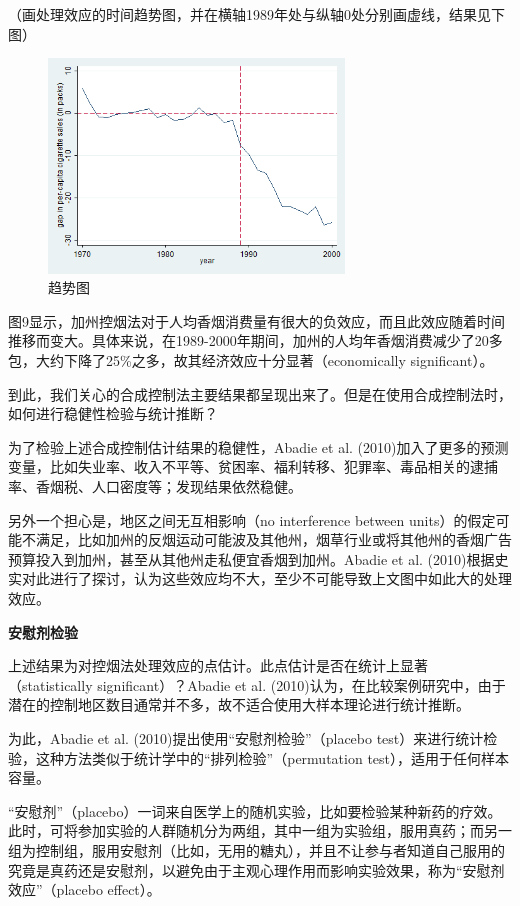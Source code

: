 \documentclass[cn,12pt,math=newtx,citestyle=gb7714-2015,bibstyle=gb7714-2015]{elegantbook}
\begin{document}
	（画处理效应的时间趋势图，并在横轴1989年处与纵轴0处分别画虚线，结果见下图）
	\begin{figure}[htbp]
		\centering
		\includegraphics[width=0.7\textwidth]{line2.png}
		\caption{趋势图}\label{fig:digit}
	\end{figure}
	
	图9显示，加州控烟法对于人均香烟消费量有很大的负效应，而且此效应随着时间推移而变大。具体来说，在1989-2000年期间，加州的人均年香烟消费减少了20多包，大约下降了25\%之多，故其经济效应十分显著（economically significant）。
	
	到此，我们关心的合成控制法主要结果都呈现出来了。但是在使用合成控制法时，如何进行稳健性检验与统计推断？
	
	为了检验上述合成控制估计结果的稳健性，Abadie et al. (2010)加入了更多的预测变量，比如失业率、收入不平等、贫困率、福利转移、犯罪率、毒品相关的逮捕率、香烟税、人口密度等；发现结果依然稳健。
	
	另外一个担心是，地区之间无互相影响（no interference between units）的假定可能不满足，比如加州的反烟运动可能波及其他州，烟草行业或将其他州的香烟广告预算投入到加州，甚至从其他州走私便宜香烟到加州。Abadie et al. (2010)根据史实对此进行了探讨，认为这些效应均不大，至少不可能导致上文图中如此大的处理效应。
	
	\textbf{安慰剂检验}
	
	上述结果为对控烟法处理效应的点估计。此点估计是否在统计上显著（statistically significant）？Abadie et al. (2010)认为，在比较案例研究中，由于潜在的控制地区数目通常并不多，故不适合使用大样本理论进行统计推断。
	
	为此，Abadie et al. (2010)提出使用“安慰剂检验”（placebo test）来进行统计检验，这种方法类似于统计学中的“排列检验”（permutation test），适用于任何样本容量。
	
	“安慰剂”（placebo）一词来自医学上的随机实验，比如要检验某种新药的疗效。此时，可将参加实验的人群随机分为两组，其中一组为实验组，服用真药；而另一组为控制组，服用安慰剂（比如，无用的糖丸），并且不让参与者知道自己服用的究竟是真药还是安慰剂，以避免由于主观心理作用而影响实验效果，称为“安慰剂效应”（placebo effect）。
	
\end{document}
